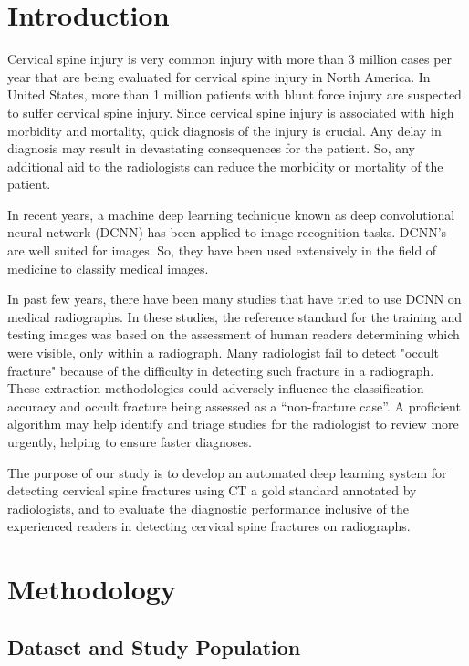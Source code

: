 \documentclass[pdflatex,sn-mathphys]{sn-jnl}%
\theoremstyle{thmstyleone}%
\theoremstyle{thmstyletwo}%
\theoremstyle{thmstylethree}%
\begin{document}
\section{Introduction}\label{sec1}

Cervical spine injury is very common injury with more than 3 million cases per year that are being evaluated for cervical spine injury in North America\cite{Milby:2008tt}. In United States, more than 1 million patients with blunt force injury are suspected to suffer cervical spine injury\cite{Minja:2018ud}. Since cervical spine injury is associated with high morbidity and mortality, quick diagnosis of the injury is crucial. Any delay in diagnosis may result in devastating consequences for the patient. So, any additional aid to the radiologists can reduce the morbidity or mortality of the patient.

In recent years, a machine deep learning technique known as deep convolutional neural network (DCNN) has been applied to image recognition tasks. DCNN's are well suited for images. So, they have been used extensively in the field of medicine to classify medical images. 

In past few years, there have been many studies that have tried to use DCNN\cite{Olczak:2017aa}\cite{Kim:2018aa}\cite{Chung:2018aa} on medical radiographs. In these studies, the reference standard for the training and testing images was based on the assessment of human readers determining which were visible, only within a radiograph. Many radiologist fail to detect "occult fracture" because of the difficulty in detecting such fracture in a radiograph. These extraction methodologies could adversely influence the classification accuracy and occult fracture being assessed as a “non-fracture case”. A proficient algorithm may help identify and triage studies for the radiologist to review more urgently, helping to ensure faster diagnoses.

The purpose of our study is to develop an automated deep learning system for detecting cervical spine fractures using CT a gold standard annotated by radiologists, and to evaluate the diagnostic performance inclusive of the experienced readers in detecting cervical spine fractures on radiographs. 

\section{Methodology}\label{sec2}

\subsection{Dataset and Study Population}\label{subsec2}
\end{document}
